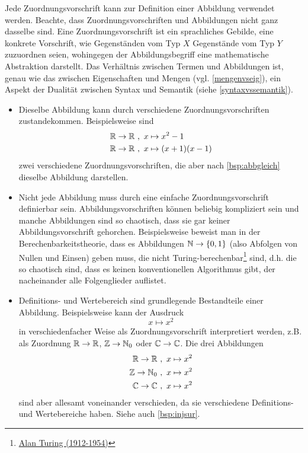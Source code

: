 \begin{bem} \label{zuordvsabb}
    Jede Zuordnungsvorschrift kann zur Definition einer Abbildung verwendet werden. Beachte, dass Zuordnungsvorschriften und Abbildungen nicht ganz dasselbe sind. Eine Zuordnungsvorschrift ist ein sprachliches Gebilde, eine konkrete Vorschrift, wie Gegenständen vom Typ $X$ Gegenstände vom Typ $Y$ zuzuordnen seien, wohingegen der Abbildungsbegriff eine mathematische Abstraktion darstellt. Das Verhältnis zwischen Termen und Abbildungen ist, genau wie das zwischen Eigenschaften und Mengen (vgl. \cref{mengenvseig}), ein Aspekt der Dualität zwischen Syntax und Semantik (siehe \cref{syntaxvssemantik}).
    \begin{itemize}
        \item Dieselbe Abbildung kann durch verschiedene Zuordnungsvorschriften zustandekommen. Beispielsweise sind
        \begin{align*}
            \mathbb R \to \mathbb R \ &,\ x\mapsto x^2-1 \\
            \mathbb R \to \mathbb R \ &,\ x\mapsto (x+1)(x-1)
        \end{align*}
        zwei verschiedene Zuordnungsvorschriften, die aber nach \cref{bsp:abbgleich} dieselbe Abbildung darstellen.
        \item Nicht jede Abbildung muss durch eine einfache Zuordnungsvorschrift definierbar sein. Abbildungsvorschriften können beliebig kompliziert sein und manche Abbildungen sind so chaotisch, dass sie gar keiner Abbildungsvorschrift gehorchen. Beispielsweise beweist man in der Berechenbarkeitstheorie, dass es Abbildungen $\mathbb N \to \{0,1\}$ (also Abfolgen von Nullen und Einsen) geben muss, die nicht Turing-berechenbar\footnote{\href{https://de.wikipedia.org/wiki/Alan_Turing}{Alan Turing (1912-1954)}} sind, d.h. die so chaotisch sind, dass es keinen konventionellen Algorithmus gibt, der nacheinander alle Folgenglieder auflistet.
        \item Definitions- und Wertebereich sind grundlegende Bestandteile einer Abbildung. Beispielsweise kann der Ausdruck
            \[ x\mapsto x^2 \]
        in verschiedenfacher Weise als Zuordnungsvorschrift interpretiert werden, z.B. als Zuordnung $\mathbb R\to \mathbb R$, $\mathbb Z\to \mathbb N_0$ oder $\mathbb C\to \mathbb C$. Die drei Abbildungen
        \begin{align*}
            \mathbb R \to \mathbb R \ & ,\ x\mapsto x^2 \\
            \mathbb Z \to \mathbb N_0 \ & ,\ x\mapsto x^2 \\
            \mathbb C \to \mathbb C \ &,\ x\mapsto x^2 
        \end{align*}
        sind aber allesamt voneinander verschieden, da sie verschiedene Definitions- und Wertebereiche haben. Siehe auch \cref{bsp:injsur}.
    \end{itemize}
\end{bem}


